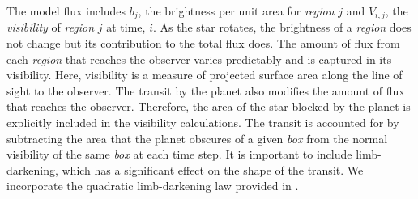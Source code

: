 The model flux includes $b_j$, the brightness per unit area for {\it region} $j$ and $V_{i,j}$, the {\it visibility} of {\it region} $j$ at time, $i$. As the star rotates, the brightness of a {\it region}  does not change but its contribution to the total flux does. The amount of flux from each {\it region} that reaches the observer varies predictably and is captured in its visibility. Here, visibility is a measure of projected surface area along the line of sight to the observer. The transit by the planet also modifies the amount of flux that reaches the observer. Therefore, the area of the star blocked by the planet is explicitly included in the visibility calculations. The transit is accounted for by subtracting the area that the planet obscures of a given {\it box} from the normal visibility of the same {\it box} at each time step. It is important to include limb-darkening, which has a significant effect on the shape of the transit. We incorporate the quadratic limb-darkening law provided in \citet{Claret2004}.


%
%
